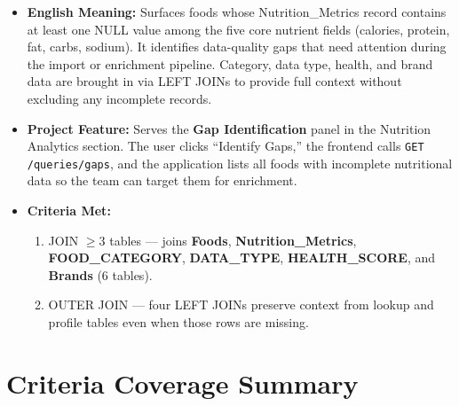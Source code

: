 \documentclass[12pt,a4paper]{article}
\begin{document}
\begin{metabox}
\begin{itemize}
  \item \textbf{English Meaning:} Surfaces foods whose Nutrition\_Metrics record contains
    at least one NULL value among the five core nutrient fields (calories, protein, fat,
    carbs, sodium). It identifies data-quality gaps that need attention during the import
    or enrichment pipeline. Category, data type, health, and brand data are brought in via
    LEFT JOINs to provide full context without excluding any incomplete records.
  \item \textbf{Project Feature:} Serves the \textbf{Gap Identification} panel in the
    Nutrition Analytics section. The user clicks ``Identify Gaps,'' the frontend calls
    \texttt{GET /queries/gaps}, and the application lists all foods with incomplete
    nutritional data so the team can target them for enrichment.
  \item \textbf{Criteria Met:}
    \begin{enumerate}[label=\textbf{\arabic*}]
      \item JOIN $\geq$3 tables --- joins \textbf{Foods}, \textbf{Nutrition\_Metrics},
        \textbf{FOOD\_CATEGORY}, \textbf{DATA\_TYPE}, \textbf{HEALTH\_SCORE}, and
        \textbf{Brands} (6 tables).
      \item OUTER JOIN --- four LEFT JOINs preserve context from lookup and profile
        tables even when those rows are missing.
    \end{enumerate}
\end{itemize}
\end{metabox}

\section{Criteria Coverage Summary}
\end{document}
